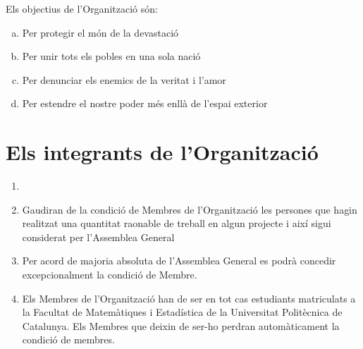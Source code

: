 \documentclass[12pt]{article}
\begin{document}
\begin{art} %
    Els objectius de l'Organització són:
    \begin{enumerate}[a)]
        \item Per protegir el món de la devastació
        \item Per unir tots els pobles en una sola nació
        \item Per denunciar els enemics de la veritat i l'amor
        \item Per estendre el nostre poder més enllà de l'espai exterior
    \end{enumerate}
\end{art}

\section{Els integrants de l'Organització}

\begin{art}
    \begin{enumerate}[1.]
        \item[]
        \item Gaudiran de la condició de Membres de l'Organització les persones que hagin realitzat una quantitat raonable de treball en algun projecte i així sigui considerat per l'Assemblea General
        \item Per acord de majoria absoluta de l'Assemblea General es podrà concedir excepcionalment la condició de Membre.
        \item Els Membres de l'Organització han de ser en tot cas estudiants matriculats a la Facultat de Matemàtiques i Estadística de la Universitat Politècnica de Catalunya. Els Membres que deixin de ser-ho perdran automàticament la condició de membres.
    \end{enumerate}
\end{art}
\end{document}
